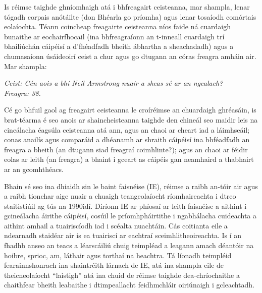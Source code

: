 \begin{multicols}{2}

Is réimse taighde ghníomhaigh atá i bhfreagairt ceisteanna, mar shampla, lenar tógadh corpais anótáilte (don Bhéarla go príomha) agus lenar tosaíodh comórtais eolaíochta. Téann coincheap freagairte ceisteanna níos faide ná cuardaigh bunaithe ar eochairfhocail (ina bhfreagraíonn an t-inneall cuardaigh trí bhailiúchán cáipéisí a d’fhéadfadh bheith ábhartha a sheachadadh) agus a chumasaíonn úsáideoirí ceist a chur agus go dtugann an córas freagra amháin air. Mar shampla:

\textit{Ceist: Cén aois a bhí Neil Armstrong nuair a sheas sé ar an ngealach?}\\
\textit{Freagra: 38.}

Cé go bhfuil gaol ag freagairt ceisteanna le croíréimse an chuardaigh ghréasáin, is brat-téarma é seo anois ar shaincheisteanna taighde den chineál seo maidir leis na cineálacha éagsúla ceisteanna atá ann, agus an chaoi ar cheart iad a láimhseáil; conas anailís agus comparáid a dhéanamh ar shraith cáipéisí ina bhféadfadh an freagra a bheith (an dtugann siad freagraí coimhlinte?); agus an chaoi ar féidir eolas ar leith (an freagra) a bhaint i gceart as cáipéis gan neamhaird a thabhairt ar an gcomhthéacs. 

Bhain sé seo ina dhiaidh sin le baint faisnéise (IE), réimse a raibh an-tóir air agus a raibh tionchar aige nuair a chuaigh teangeolaíocht ríomhaireachta i dtreo staitistiúil ag tús na 1990idí. Díríonn IE ar phíosaí ar leith faisnéise a aithint i gcineálacha áirithe cáipéisí, cosúil le príomhpháirtithe i ngabhálacha cuideachta a aithint amhail a tuairiscíodh iad i scéalta nuachtáin. Cás coitianta eile a ndearnadh staidéar air is ea tuairiscí ar eachtraí sceimhlitheoireachta. Is í an fhadhb anseo an teacs a léarscáiliú chuig teimpléad a leagann amach déantóir na hoibre, sprioc, am, láthair agus torthaí na heachtra. Tá líonadh teimpléid fearainnshonrach ina shaintréith lárnach de IE, atá ina shampla eile de theicneolaíocht ``laistigh'' atá ina chuid de réimse taighde dea-chríochaithe a chaithfear bheith leabaithe i dtimpeallacht feidhmchláir oiriúnaigh i gcleachtadh.


\end{multicols}
